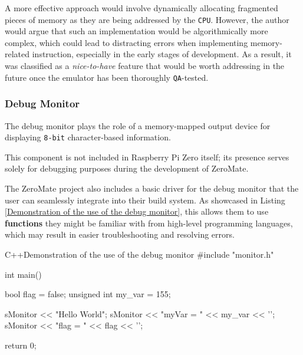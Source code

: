 \documentclass[english, ing, kiv, he, iso690numb, pdf]{fasthesis}
\begin{document}
	A more effective approach would involve dynamically allocating fragmented pieces of memory as they are being addressed by the \texttt{CPU}. However, the author would argue that such an implementation would be algorithmically more complex, which could lead to distracting errors when implementing memory-related instruction, especially in the early stages of development. As a result, it was classified as a \textit{nice-to-have} feature that would be worth addressing in the future once the emulator has been thoroughly \texttt{QA}-tested.
	
	\newpage
	
	\subsubsection{Debug Monitor} \label{section-Debug-Monitor}
	
	The debug monitor plays the role of a memory-mapped output device for displaying \texttt{8-bit} character-based information.
	
	\begin{important}
		This component is not included in Raspberry Pi Zero itself; its presence serves solely for debugging purposes during the development of ZeroMate.
	\end{important}
	
	The ZeroMate project also includes a basic driver for the debug monitor that the user can seamlessly integrate into their build system. As showcased in Listing \ref{Demonstration of the use of the debug monitor}, this allows them to use \textbf{ functions} they might be familiar with from high-level programming languages, which may result in easier troubleshooting and resolving errors.
	
\begin{code}{C++}{Demonstration of the use of the debug monitor \label{Demonstration of the use of the debug monitor}}
#include "monitor.h"

int main() {
	bool flag = false;
	unsigned int my_var = 155;
	
	sMonitor << "Hello World\n";
	sMonitor << "myVar = " << my_var << '\n';
	sMonitor << "flag = " << flag << '\n';
	
	return 0;
}
\end{code}
	
\end{document}
